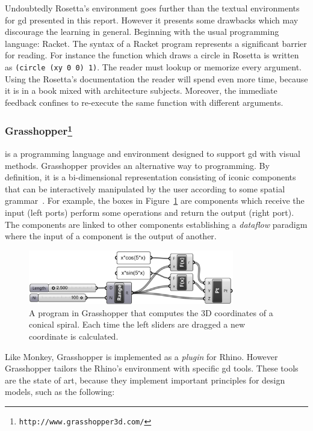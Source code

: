 Undoubtedly Rosetta's environment goes further than the textual environments for \ac{gd} presented in this report. However it presents some drawbacks which may discourage the learning in general. Beginning with the usual programming language: Racket. The syntax of a Racket program represents a significant barrier for reading. For instance the function which draws a circle in Rosetta is written as \texttt{(circle (xy 0 0) 1)}. The reader must lookup or memorize every argument. Using the Rosetta's documentation the reader will spend even more time, because it is in a book mixed with architecture subjects. Moreover, the immediate feedback confines to re-execute the same function with different arguments.
\subsubsection{Grasshopper\protect\footnote{\texttt{http://www.grasshopper3d.com/}}} is a programming language and environment designed to support \ac{gd} with visual methods. Grasshopper provides an alternative way to programming. By definition, it is a bi-dimensional representation consisting of iconic components that can be interactively manipulated by the user according to some spatial grammar~\cite{myers1990taxonomies}. For example, the boxes in Figure~\ref{fig:grass} are components which receive the input (left ports) perform some operations and return the output (right port). The components are linked to other components establishing a \textit{dataflow} paradigm where the input of a component is the output of another.

\begin{figure}[!htbp]
  \centering
  \includegraphics[width=0.8\textwidth]{img/grasshopper}
    \caption{A program in Grasshopper that computes the 3D coordinates of a conical spiral. Each time the left sliders are dragged a new coordinate is calculated.}
  \label{fig:grass}
\end{figure}

Like Monkey, Grasshopper is implemented as a \textit{plugin} for Rhino\footnotemark[\ref{rhin}]. However Grasshopper tailors the Rhino's environment with specific \ac{gd} tools. These tools are the state of art, because they implement important principles for design models, such as the following:

